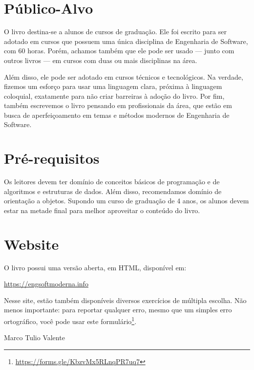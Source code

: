 \documentclass[
  11pt,
  twoside]{book}
\DeclareRobustCommand{\href}[2]{#2\footnote{\url{#1}}}
\begin{document}
\hypertarget{puxfablico-alvo}{%
\section*{Público-Alvo}\label{puxfablico-alvo}}

O livro destina-se a alunos de cursos de graduação. Ele foi escrito para
ser adotado em cursos que possuem uma única disciplina de Engenharia de
Software, com 60 horas. Porém, achamos também que ele pode ser usado ---
junto com outros livros --- em cursos com duas ou mais disciplinas na
área.

Além disso, ele pode ser adotado em cursos técnicos e tecnológicos. Na
verdade, fizemos um esforço para usar uma linguagem clara, próxima à
linguagem coloquial, exatamente para não criar barreiras à adoção do
livro. Por fim, também escrevemos o livro pensando em profissionais da
área, que estão em busca de aperfeiçoamento em temas e métodos modernos
de Engenharia de Software.

\hypertarget{pruxe9-requisitos}{%
\section*{Pré-requisitos}\label{pruxe9-requisitos}}

Os leitores devem ter domínio de conceitos básicos de programação e de
algoritmos e estruturas de dados. Além disso, recomendamos domínio de
orientação a objetos. Supondo um curso de graduação de 4 anos, os alunos
devem estar na metade final para melhor aproveitar o conteúdo do livro.

\hypertarget{website}{%
\section*{Website}\label{website}}

O livro possui uma versão aberta, em HTML, disponível em:

\url{https://engsoftmoderna.info}

Nesse site, estão também disponíveis diversos exercícios de múltipla
escolha. Não menos importante: para reportar qualquer erro, mesmo que um
simples erro ortográfico, você pode usar este
\href{https://forms.gle/KbzvMx5RLnqPR7uq7}{formulário}.

\vspace{0.3cm}

Marco Tulio Valente
\end{document}
